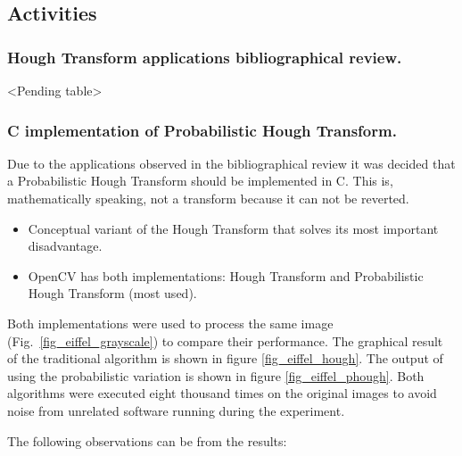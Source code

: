 \subsection{Activities}


\subsubsection[Hough Transform bibliographical review.]{Hough Transform applications bibliographical review.}
<Pending table>


\subsubsection{C implementation of Probabilistic Hough Transform.}

Due to the applications observed in the bibliographical review it was decided that a Probabilistic Hough Transform should be implemented in C. This is, mathematically speaking, not a transform because it can not be reverted.





\begin{itemize}
	\item Conceptual variant of the Hough Transform that solves its most important disadvantage.
	\item OpenCV has both implementations: Hough Transform and Probabilistic Hough Transform (most used).
\end{itemize}



Both implementations were used to process the same image (Fig.~\ref{fig_eiffel_grayscale}) to compare their performance. The graphical result of the traditional algorithm is shown in figure \ref{fig_eiffel_hough}. The output of using the probabilistic variation is shown in figure \ref{fig_eiffel_phough}. Both algorithms were executed eight thousand times on the original images to avoid noise from unrelated software running during the experiment.

The following observations can be from the results:

